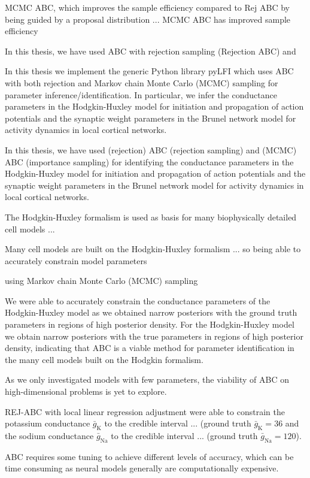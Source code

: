 MCMC ABC, which improves the sample efficiency compared to Rej ABC by being guided by a proposal distribution ... MCMC ABC has improved sample efficiency 



In this thesis, we have used ABC with rejection sampling (Rejection ABC) and

In this thesis we implement the generic Python library pyLFI which uses ABC with both rejection and Markov chain Monte Carlo (MCMC) sampling for parameter inference/identification. In particular, we infer the conductance parameters in the Hodgkin-Huxley model for initiation and propagation of action potentials and the synaptic weight parameters in the Brunel network model for activity dynamics in local cortical networks. 

In this thesis, we have used (rejection) ABC (rejection sampling) and (MCMC) ABC (importance sampling) for identifying the conductance parameters in the Hodgkin-Huxley model for initiation and propagation of action potentials and the synaptic weight parameters in the Brunel network model for activity dynamics in local cortical networks. 

The Hodgkin-Huxley formalism is used as basis for many biophysically detailed cell models ...

Many cell models are built on the Hodgkin-Huxley formalism ... so being able to accurately constrain model parameters

using Markov chain Monte Carlo (MCMC) sampling

We were able to accurately constrain the conductance parameters of the Hodgkin-Huxley model as we obtained narrow posteriors with the ground truth parameters in regions of high posterior density. 
For the Hodgkin-Huxley model we obtain narrow posteriors with the true parameters in regions of high posterior density, indicating that ABC is a viable method for parameter identification in the many cell models built on the Hodgkin formalism. 

As we only investigated models with few parameters, the viability of ABC on high-dimensional problems is yet to explore. 


REJ-ABC with local linear regression adjustment were able to constrain the potassium conductance $\bar{g}_\mathrm{K}$ to the credible interval ... (ground truth $\bar{g}_\mathrm{K} = 36$ and the sodium conductance $\bar{g}_\mathrm{Na}$ to the credible interval ... (ground truth $\bar{g}_\mathrm{Na} = 120$).

ABC requires some tuning to achieve different levels of accuracy, which can be time consuming as neural models generally are computationally expensive. 